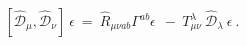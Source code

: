 \begin{equation} \label{}
  [ \hat{\mathcal{D}}_\mu , \hat{\mathcal{D}}_\nu ] \: \epsilon \: = \:
  \hat{R}_{\mu\nu ab} \Gamma^{ab} \epsilon \:  \:
  - \: T^\lambda_{\mu\nu} \: \hat{\mathcal{D}}_\lambda \: \epsilon \ .
\end{equation}

